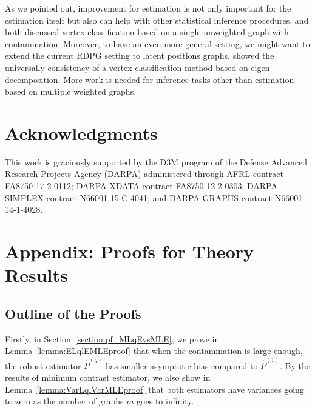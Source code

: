 \documentclass[a4paper]{article}
\renewcommand{\hat}{\widehat}
\begin{document}
As we pointed out, improvement for estimation is not only important for the estimation itself but also can help with other statistical inference procedures. \citet{priebe2015statistical} and \citet{chen2016robust} both discussed vertex classification based on a single unweighted graph with contamination.
Moreover, to have an even more general setting, we might want to extend the current RDPG setting to latent positions graphs. \citet{tang2013universally} showed the universally consistency of a vertex classification method based on eigen-decomposition.
More work is needed for inference tasks other than estimation based on multiple weighted graphs.


\section*{Acknowledgments}
This work is graciously supported by the D3M program of the Defense
Advanced Research Projects Agency (DARPA) administered through AFRL contract FA8750-17-2-0112; DARPA XDATA contract FA8750-12-2-0303; DARPA SIMPLEX contract N66001-15-C-4041; and DARPA GRAPHS
contract N66001-14-1-4028.


{}




\newpage

\appendix

\section{Appendix: Proofs for Theory Results}

\subsection{Outline of the Proofs}

Firstly, in Section~\ref{section:pf_MLqEvsMLE}, we prove in Lemma~\ref{lemma:ELqlEMLEproof} that when the contamination is large enough, the robust estimator $\hat{P}^{(q)}$ has smaller asymptotic bias compared to $\hat{P}^{(1)}$. By the results of minimum contrast estimator, we also show in Lemma~\ref{lemma:VarLqlVarMLEproof} that both estimators have variances going to zero as the number of graphs $m$ goes to infinity.
\end{document}
